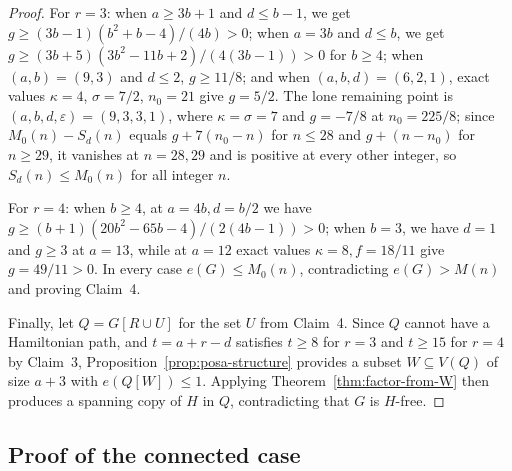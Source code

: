 \documentclass[10pt]{article}
\theoremstyle{compactplain}
\theoremstyle{remark}\newtheorem{remark}[theorem]{Remark}
\begin{document}
\begin{proof}
For $r=3$: when $a\ge3b+1$ and $d\le b-1$, we get
$g\ge(3b-1)(b^2+b-4)/(4b)>0$; when $a=3b$ and $d\le b$, we get
$g\ge(3b+5)(3b^2-11b+2)/(4(3b-1))>0$ for $b\ge4$; when $(a,b)=(9,3)$
and $d\le2$, $g\ge11/8$; and when $(a,b,d)=(6,2,1)$, exact values
$\kappa=4$, $\sigma=7/2$, $n_0=21$ give $g=5/2$. The lone remaining
point is $(a,b,d,\varepsilon)=(9,3,3,1)$, where $\kappa=\sigma=7$ and
$g=-7/8$ at $n_0=225/8$; since $M_0(n)-S_d(n)$ equals $g+7(n_0-n)$ for
$n\le28$ and $g+(n-n_0)$ for $n\ge29$, it vanishes at $n=28,29$ and is
positive at every other integer, so $S_d(n)\le M_0(n)$ for all integer
$n$.

For $r=4$: when $b\ge4$, at $a=4b,d=b/2$ we have
$g\ge(b+1)(20b^2-65b-4)/(2(4b-1))>0$; when $b=3$, we have $d=1$ and
$g\ge3$ at $a=13$, while at $a=12$ exact values $\kappa=8,f=18/11$ give
$g=49/11>0$. In every case $e(G)\le M_0(n)$, contradicting $e(G)>M(n)$
and proving Claim~4.

Finally, let $Q=G[R\cup U]$ for the set $U$ from Claim~4. Since $Q$
cannot have a Hamiltonian path, and $t=a+r-d$ satisfies $t\ge8$ for
$r=3$ and $t\ge15$ for $r=4$ by Claim~3,
Proposition~\ref{prop:posa-structure} provides a subset $W\subseteq V(Q)$
of size $a+3$ with $e(Q[W])\le1$. Applying
Theorem~\ref{thm:factor-from-W} then produces a spanning copy of $H$ in
$Q$, contradicting that $G$ is $H$-free.
\end{proof}

\subsection{Proof of the connected case}
\end{document}
